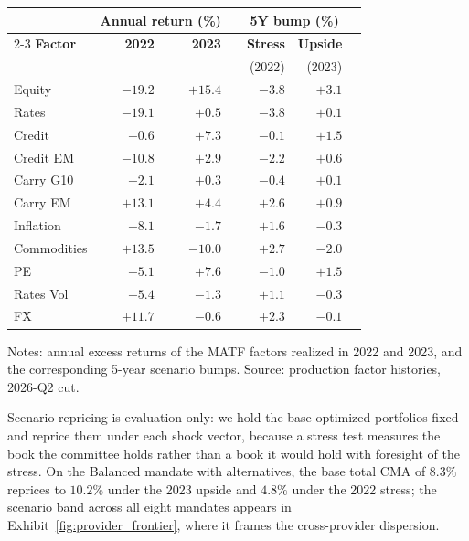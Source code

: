 \documentclass[pdftex,12pt,a4paper]{article}
\begin{document}
\begin{table}[H]
	\label{tab:factor_returns}\vspace*{-1.0\baselineskip}
	\begin{center}
		\small
		\begin{tabular}{lrrrrrr}
			\toprule
			& \multicolumn{2}{c}{\textbf{Annual return (\%)}} & & \multicolumn{2}{c}{\textbf{5Y bump (\%)}} \\
			\cmidrule{2-3} \cmidrule{5-6}
			\textbf{Factor} & \textbf{2022} & \textbf{2023} & & \textbf{Stress} & \textbf{Upside} \\
			& & & & (2022) & (2023) \\
			\midrule
			Equity        & $-19.2$ & $+15.4$ & & $-3.8$ & $+3.1$ \\
			Rates         & $-19.1$ & $+0.5$  & & $-3.8$ & $+0.1$ \\
			Credit        & $-0.6$  & $+7.3$  & & $-0.1$ & $+1.5$ \\
			Credit EM     & $-10.8$ & $+2.9$  & & $-2.2$ & $+0.6$ \\
			Carry G10     & $-2.1$  & $+0.3$  & & $-0.4$ & $+0.1$ \\
			Carry EM      & $+13.1$ & $+4.4$  & & $+2.6$ & $+0.9$ \\
			Inflation     & $+8.1$  & $-1.7$  & & $+1.6$ & $-0.3$ \\
			Commodities   & $+13.5$ & $-10.0$ & & $+2.7$ & $-2.0$ \\
			PE            & $-5.1$  & $+7.6$  & & $-1.0$ & $+1.5$ \\
			Rates Vol     & $+5.4$  & $-1.3$  & & $+1.1$ & $-0.3$ \\
			FX            & $+11.7$ & $-0.6$  & & $+2.3$ & $-0.1$ \\
			\bottomrule
		\end{tabular}
	\end{center}
	\vspace*{-0.5\baselineskip}
	{\footnotesize Notes: annual excess returns of the MATF factors realized in 2022 and 2023, and the corresponding 5-year scenario bumps. Source: production factor histories, 2026-Q2 cut.}
\end{table}

Scenario repricing is evaluation-only: we hold the base-optimized portfolios fixed and reprice them under each shock vector, because a stress test measures the book the committee holds rather than a book it would hold with foresight of the stress. On the Balanced mandate with alternatives, the base total CMA of $8.3\%$ reprices to $10.2\%$ under the 2023 upside and $4.8\%$ under the 2022 stress; the scenario band across all eight mandates appears in Exhibit~\ref{fig:provider_frontier}, where it frames the cross-provider dispersion.
\end{document}
